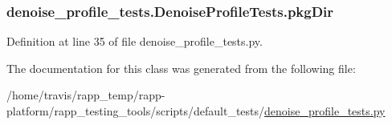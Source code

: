 \hypertarget{classdenoise__profile__tests_1_1DenoiseProfileTests_a2b1fb6f5b778b97fee6fec87826f5601}{
\subsubsection[{pkg\-Dir}]{\setlength{\rightskip}{0pt plus 5cm}denoise\-\_\-profile\-\_\-tests.\-Denoise\-Profile\-Tests.\-pkg\-Dir}}\label{classdenoise__profile__tests_1_1DenoiseProfileTests_a2b1fb6f5b778b97fee6fec87826f5601}


Definition at line 35 of file denoise\-\_\-profile\-\_\-tests.\-py.



The documentation for this class was generated from the following file\-:\begin{DoxyCompactItemize}
\item 
/home/travis/rapp\-\_\-temp/rapp-\/platform/rapp\-\_\-testing\-\_\-tools/scripts/default\-\_\-tests/\hyperlink{denoise__profile__tests_8py}{denoise\-\_\-profile\-\_\-tests.\-py}\end{DoxyCompactItemize}
